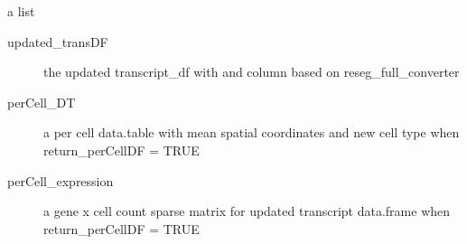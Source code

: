 \documentclass[letterpaper]{book}
\begin{document}
%
\begin{Value}
a list
\begin{description}

\item[updated\_transDF] the updated transcript\_df with  and  column based on reseg\_full\_converter
\item[perCell\_DT] a per cell data.table with mean spatial coordinates and new cell type when return\_perCellDF = TRUE
\item[perCell\_expression] a gene x cell count sparse matrix for updated transcript data.frame when return\_perCellDF = TRUE

\end{description}

\end{Value}
\printindex{}
\end{document}
